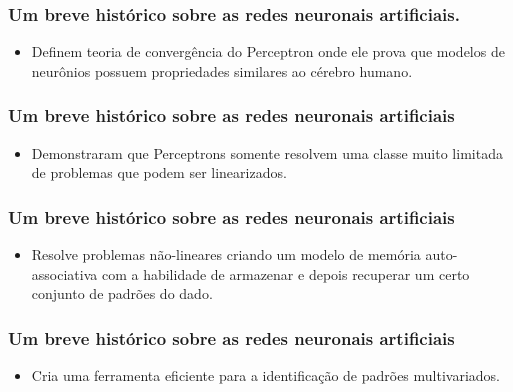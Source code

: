 \documentclass[aspectratio=10]{beamer} %
\begin{document}
\begin{frame}
\frametitle{Um breve histórico sobre as redes neuronais artificiais.}
\begin{small}
\end{small}
\begin{itemize}
\item Definem teoria de convergência do Perceptron onde ele prova que modelos de neurônios possuem propriedades similares ao cérebro humano.
\end{itemize}
\end{frame}

\begin{frame}
\frametitle{Um breve histórico sobre as redes neuronais artificiais}
\begin{small}
\end{small}
\begin{itemize}
\item Demonstraram que Perceptrons somente resolvem uma classe muito limitada de problemas que podem ser linearizados.
\end{itemize}
\end{frame}

\begin{frame}
\frametitle{Um breve histórico sobre as redes neuronais artificiais}
\begin{small}
\end{small}
\begin{itemize}
\item Resolve problemas não-lineares criando um  modelo de memória auto-associativa com a habilidade de armazenar e depois recuperar um certo conjunto de padrões do dado.  
\end{itemize}
\end{frame}

\begin{frame}
\frametitle{Um breve histórico sobre as redes neuronais artificiais}
\begin{small}
\end{small}
\begin{itemize}
\item Cria uma ferramenta eficiente para a identificação de padrões multivariados.  
\end{itemize}
\end{frame}
\end{document}
